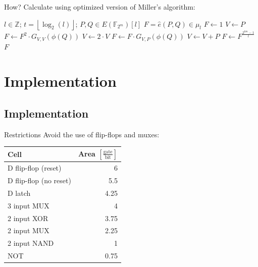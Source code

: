 \documentclass[svgnames, handout,t]{beamer}
\begin{document}
\begin{frame}{How?}
	Calculate using optimized version of Miller's algorithm:\\[1em]
		\scriptsize{
		\begin{algorithmic}
			\REQUIRE $l \in \mathbb{Z}$; $t = \left\lfloor \log _2 (l) \right\rfloor$; $P, Q \in E(\mathbb{F}_{2^m})[l]$
			\ENSURE $F = \hat{e}(P, Q) \in \mu _l$
			\STATE $F \gets 1$
			\STATE $V \gets P$
				\STATE $F \gets F^2 \cdot G_{V,V}(\phi(Q))$
				\STATE $V \gets 2 \cdot V$
					\STATE $F \gets F \cdot G_{V,P}(\phi(Q))$
					\STATE $V \gets V + P$
				\ENDIF
			\ENDFOR
			\STATE $F \gets F^{\frac{2^{km} - 1 }{l}}$
			\RETURN $F$
		\end{algorithmic}}
\end{frame}

\section{Implementation}
\subsection*{Implementation}
\begin{frame}{Restrictions}
Avoid the use of flip-flops and muxes:

	\begin{center}
	\begin{tabular}{lr}
		\toprule
		Cell							& Area $\left[\frac{\text{gate}}{\text{bit}}\right]$\\
		\midrule
		D flip-flop (reset)		& 6\\
		D flip-flop (no reset)	& 5.5\\
		D latch						& 4.25\\
		3 input MUX					& 4\\
		2 input XOR					& 3.75\\
		2 input MUX					& 2.25\\
		2 input NAND				& 1\\
		NOT							& 0.75\\
		\bottomrule
	\end{tabular}
	\end{center}
\end{frame}
\end{document}
